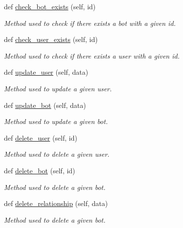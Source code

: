 \begin{DoxyCompactItemize}
def \hyperlink{classtwitter_1_1wrappers_1_1neo4j__wrapper_1_1Neo4jAPI_a09920f8af8cb34875f6366969a8deb16}{check\+\_\+bot\+\_\+exists} (self, id)
\begin{DoxyCompactList}\small\item\em Method used to check if there exists a bot with a given id. \end{DoxyCompactList}\item 
def \hyperlink{classtwitter_1_1wrappers_1_1neo4j__wrapper_1_1Neo4jAPI_ab4ab706214e7d29521c47a40fe1e5b49}{check\+\_\+user\+\_\+exists} (self, id)
\begin{DoxyCompactList}\small\item\em Method used to check if there exists a user with a given id. \end{DoxyCompactList}\item 
def \hyperlink{classtwitter_1_1wrappers_1_1neo4j__wrapper_1_1Neo4jAPI_a8efba948fa1e68c7b3fe9a604bce53db}{update\+\_\+user} (self, data)
\begin{DoxyCompactList}\small\item\em Method used to update a given user. \end{DoxyCompactList}\item 
def \hyperlink{classtwitter_1_1wrappers_1_1neo4j__wrapper_1_1Neo4jAPI_a15bc8d8d0b8752f6295ab8f1e5af6986}{update\+\_\+bot} (self, data)
\begin{DoxyCompactList}\small\item\em Method used to update a given bot. \end{DoxyCompactList}\item 
def \hyperlink{classtwitter_1_1wrappers_1_1neo4j__wrapper_1_1Neo4jAPI_ae3b7f7e89b8fbf3ee7c3c93d983da7c7}{delete\+\_\+user} (self, id)
\begin{DoxyCompactList}\small\item\em Method used to delete a given user. \end{DoxyCompactList}\item 
def \hyperlink{classtwitter_1_1wrappers_1_1neo4j__wrapper_1_1Neo4jAPI_a0995256fecdd24166fe3f8c0276a1124}{delete\+\_\+bot} (self, id)
\begin{DoxyCompactList}\small\item\em Method used to delete a given bot. \end{DoxyCompactList}\item 
def \hyperlink{classtwitter_1_1wrappers_1_1neo4j__wrapper_1_1Neo4jAPI_a8a22a235f9b252a3d890e50a3f8770e9}{delete\+\_\+relationship} (self, data)
\begin{DoxyCompactList}\small\item\em Method used to delete a given bot. \end{DoxyCompactList}\item 

\end{DoxyCompactItemize}
